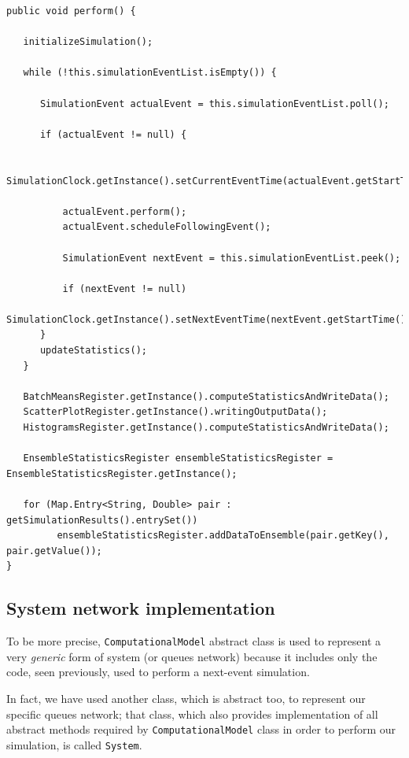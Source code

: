 \documentclass[10pt,a4paper]{article}
\begin{document}
\begin{lstlisting}[frame=lines, caption={Snippet of \texttt{perform} method}, label={code:perform}]
public void perform() {

   initializeSimulation();
   
   while (!this.simulationEventList.isEmpty()) {

      SimulationEvent actualEvent = this.simulationEventList.poll();

      if (actualEvent != null) {

          SimulationClock.getInstance().setCurrentEventTime(actualEvent.getStartTime());

          actualEvent.perform();
          actualEvent.scheduleFollowingEvent();

          SimulationEvent nextEvent = this.simulationEventList.peek();

          if (nextEvent != null)
              SimulationClock.getInstance().setNextEventTime(nextEvent.getStartTime());
      }
      updateStatistics();
   }

   BatchMeansRegister.getInstance().computeStatisticsAndWriteData();
   ScatterPlotRegister.getInstance().writingOutputData();
   HistogramsRegister.getInstance().computeStatisticsAndWriteData();

   EnsembleStatisticsRegister ensembleStatisticsRegister = EnsembleStatisticsRegister.getInstance();

   for (Map.Entry<String, Double> pair : getSimulationResults().entrySet())
         ensembleStatisticsRegister.addDataToEnsemble(pair.getKey(), pair.getValue());
}
\end{lstlisting}

\subsection{System network implementation}

To be more precise, \texttt{ComputationalModel} abstract class is used to represent a very \textit{generic} form of system (or queues network) because it includes only the code, seen previously, used to perform a next-event simulation.  

In fact, we have used another class, which is abstract too, to represent our specific queues network; that class, which also provides implementation of all abstract methods required by  \texttt{ComputationalModel} class in order to perform our simulation, is called \texttt{System}.
\end{document}
